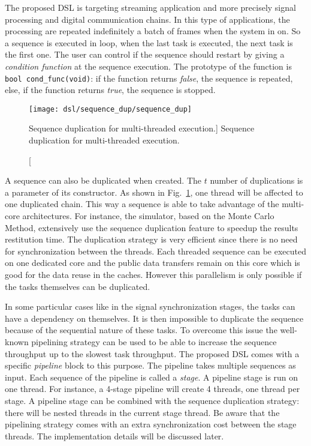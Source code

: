 The proposed DSL is targeting streaming application and more precisely signal
processing and digital communication chains. In this type of applications, the
processing are repeated indefinitely a batch of frames when the system in on. So
a sequence is executed in loop, when the last task is executed, the next task is
the first one. The user can control if the sequence should restart by giving a
\emph{condition function} at the sequence execution. The prototype of the
function is \verb|bool cond_func(void)|: if the function returns \emph{false},
the sequence is repeated, else, if the function returns \emph{true}, the
sequence is stopped.

\begin{figure}[htp]
  \centering
  \texttt{[image: dsl/sequence\_dup/sequence\_dup]}
  \caption
    [Sequence duplication for multi-threaded execution.]
    {Sequence duplication for multi-threaded execution.}
  \label{fig:dsl_sequence_dup}
\end{figure}

A sequence can also be duplicated when created. The $t$ number of duplications
is a parameter of its constructor. As shown in Fig.~\ref{fig:dsl_sequence_dup},
one thread will be affected to one duplicated chain. This way a sequence is able
to take advantage of the multi-core architectures. For instance, the \AFFECT
simulator, based on the Monte Carlo Method, extensively use the sequence
duplication feature to speedup the results restitution time. The duplication
strategy is very efficient since there is no need for synchronization between
the threads. Each threaded sequence can be executed on one dedicated core and
the public data transfers remain on this core which is good for the data reuse
in the caches. However this parallelism is only possible if the tasks themselves
can be duplicated.

In some particular cases like in the signal synchronization stages, the tasks
can have a dependency on themselves. It is then impossible to duplicate the
sequence because of the sequential nature of these tasks. To overcome this issue
the well-known pipelining strategy can be used to be able to increase the
sequence throughput up to the slowest task throughput. The proposed DSL comes
with a specific \emph{pipeline} block to this purpose. The pipeline takes
multiple sequences as input. Each sequence of the pipeline is called a
\emph{stage}. A pipeline stage is run on one thread. For instance, a 4-stage
pipeline will create 4 threads, one thread per stage. A pipeline stage can be
combined with the sequence duplication strategy: there will be nested threads in
the current stage thread. Be aware that the pipelining strategy comes with an
extra synchronization cost between the stage threads. The implementation details
will be discussed later.

